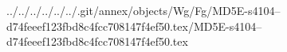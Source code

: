 ../../../../../../.git/annex/objects/Wg/Fg/MD5E-s4104--d74feeef123fbd8c4fcc708147f4ef50.tex/MD5E-s4104--d74feeef123fbd8c4fcc708147f4ef50.tex